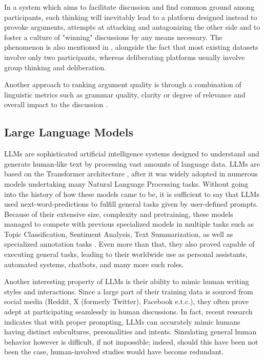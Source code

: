 In a system which aims to facilitate discussion and find common ground among participants, such thinking will inevitably lead to a platform designed instead to provoke arguments, attempts at attacking and antagonizing the other side and to foster a culture of "winning" discussions by any means necessary. The phenomenon is also mentioned in \cite{karadzhov2023delidata}, alongside the fact that most existing datasets involve only two participants, whereas deliberating platforms usually involve group thinking and deliberation. 

Another approach to ranking argument quality is through a combination of linguistic metrics such as grammar quality, clarity or degree of relevance and overall impact to the discussion \cite{Gretz2019ALD}.

\subsection{Large Language Models}
\label{sec:background:llm}

\acp{LLM} are sophisticated artificial intelligence systems designed to understand and generate human-like text by processing vast amounts of language data. LLMs are based on the Transformer architecture \cite{vaswani2023attentionneed}, after it was widely adopted in numerous models undertaking many Natural Language Processing tasks. Without going into the history of how these models came to be, it is sufficient to say that LLMs used next-word-predictions to fulfill general tasks given by user-defined prompts. Because of their extensive size, complexity and pretraining, these models managed to compete with  previous specialized models in multiple tasks such as Topic Classification, Sentiment Analysis, Text Summarization, \cite{ts2024} as well as specialized annotation tasks \cite{tan2024largelanguagemodelsdata}.  Even more than that, they also proved capable of executing general tasks, leading to their worldwide use as personal assistants, automated systems, chatbots, and many more such roles. 

Another interesting property of LLMs is their ability to mimic human writing styles and interactions. Since a large part of their training data is sourced from social media (Reddit, X (formerly Twitter),  Facebook e.t.c.), they often prove adept at participating seamlessly in human discussions. In fact, recent research \cite{Vezhnevets2023GenerativeAM, aher2023usinglargelanguagemodels} indicates that with proper prompting, LLMs can accurately mimic humans having distinct subcultures, personalities and intents. Simulating general human behavior however is difficult, if not impossible; indeed, should this have been not been the case, human-involved studies would have become redundant.

